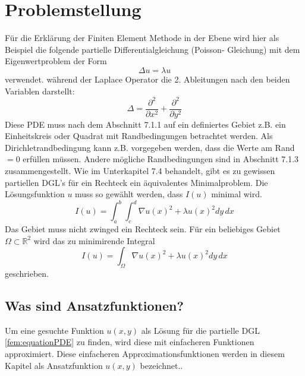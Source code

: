 %
%
%
\section{Problemstellung
\label{fem:section:problemstellung}}
Für die Erklärung der Finiten Element Methode in der Ebene wird hier als Beispiel die folgende partielle Differentialgleichung (Poisson- Gleichung) mit dem Eigenwertproblem der Form 
\begin{equation}
	\Delta u = \lambda u
	\label{fem:equationPDE}
\end{equation}
verwendet. während der Laplace Operator die 2. Ableitungen nach den beiden Variablen darstellt:
\begin{equation}
	\Delta = \frac{\partial ^2}{\partial x^2} + \frac{\partial ^2}{\partial y^2}
\end{equation} 
Diese PDE muss nach dem Abschnitt 7.1.1 auf ein definiertes Gebiet z.B. ein Einheitskreis oder Quadrat mit Randbedingungen betrachtet werden. Als Dirichletrandbedingung kann z.B. vorgegeben werden, dass die Werte am Rand $= 0$ erfüllen müssen. Andere mögliche Randbedingungen sind in Abschnitt 7.1.3 zusammengestellt. Wie im Unterkapitel 7.4 behandelt, gibt es zu gewissen partiellen DGL's für ein Rechteck ein äquivalentes Minimalproblem. Die Lösungsfunktion $u$ muss so gewählt werden, dass $I(u)$ minimal wird.
\begin{equation}
	I(u) = \int_a^b \int_c^d \nabla u(x)^2 + \lambda u(x)^2 dy \, dx
	\label{fem:equationMinimalKapt7}
\end{equation}
Das Gebiet muss nicht zwinged ein Rechteck sein. Für ein beliebiges Gebiet $\Omega \subset \mathbb{R}^2$ wird das zu minimirende Integral  %
\begin{equation}
	I(u) = \int_{\Omega} \nabla u(x)^2 + \lambda u(x)^2 dy \, dx
	\label{fem:equationMinimalKapt7Alg}
\end{equation}
geschrieben.
\subsection{Was sind Ansatzfunktionen?}
Um eine gesuchte Funktion $u(x,y)$ als Lösung für die partielle DGL \eqref{fem:equationPDE} zu finden, wird diese mit einfacheren Funktionen approximiert. Diese einfacheren Approximationsfunktionen werden in diesem Kapitel als Ansatzfunktion $u(x,y)$ bezeichnet..

